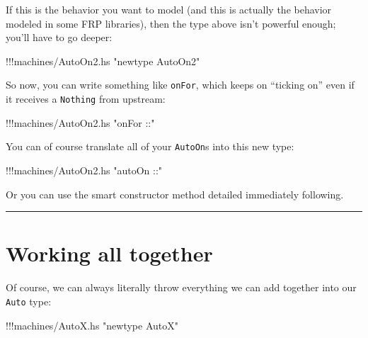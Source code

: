 \documentclass[]{article}
\newenvironment{Shaded}{}{}
\newcommand{\StringTok}[1]{\textcolor[rgb]{0.25,0.44,0.63}{{#1}}}
\newcommand{\FunctionTok}[1]{\textcolor[rgb]{0.02,0.16,0.49}{{#1}}}
\newcommand{\NormalTok}[1]{{#1}}
\begin{document}
If this is the behavior you want to model (and this is actually the
behavior modeled in some FRP libraries), then the type above isn't
powerful enough; you'll have to go deeper:

\begin{Shaded}
\begin{Highlighting}[]
\FunctionTok{!!!}\NormalTok{machines}\FunctionTok{/}\NormalTok{AutoOn2.hs }\StringTok{"newtype AutoOn2"}
\end{Highlighting}
\end{Shaded}

So now, you can write something like \texttt{onFor}, which keeps on
``ticking on'' even if it receives a \texttt{Nothing} from upstream:

\begin{Shaded}
\begin{Highlighting}[]
\FunctionTok{!!!}\NormalTok{machines}\FunctionTok{/}\NormalTok{AutoOn2.hs }\StringTok{"onFor ::"}
\end{Highlighting}
\end{Shaded}

You can of course translate all of your \texttt{AutoOn}s into this new
type:

\begin{Shaded}
\begin{Highlighting}[]
\FunctionTok{!!!}\NormalTok{machines}\FunctionTok{/}\NormalTok{AutoOn2.hs }\StringTok{"autoOn ::"}
\end{Highlighting}
\end{Shaded}

Or you can use the smart constructor method detailed immediately
following.

\begin{center}\rule{0.5\linewidth}{\linethickness}\end{center}

\section{Working all together}\label{working-all-together}

Of course, we can always literally throw everything we can add together
into our \texttt{Auto} type:

\begin{Shaded}
\begin{Highlighting}[]
\FunctionTok{!!!}\NormalTok{machines}\FunctionTok{/}\NormalTok{AutoX.hs }\StringTok{"newtype AutoX"}
\end{Highlighting}
\end{Shaded}
\end{document}
